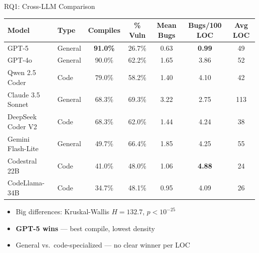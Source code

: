 \documentclass[aspectratio=169]{beamer}
\begin{document}
\begin{frame}{RQ1: Cross-LLM Comparison}
\begin{center}
\scriptsize
\begin{tabular}{@{}llccccc@{}}
\toprule
\textbf{Model} & \textbf{Type} & \textbf{Compiles} & \textbf{\% Vuln} & \textbf{Mean Bugs} & \textbf{Bugs/100 LOC} & \textbf{Avg LOC} \\
\midrule
GPT-5               & General & \textbf{91.0\%} & 26.7\% & 0.63 & \textbf{0.99} & 49 \\
GPT-4o              & General & 90.0\% & 62.2\% & 1.65 & 3.86 & 52 \\
Qwen 2.5 Coder      & Code    & 79.0\% & 58.2\% & 1.40 & 4.10 & 42 \\
Claude 3.5 Sonnet   & General & 68.3\% & 69.3\% & 3.22 & 2.75 & 113 \\
DeepSeek Coder V2   & Code    & 68.3\% & 62.0\% & 1.44 & 4.24 & 38 \\
Gemini Flash-Lite   & General & 49.7\% & 66.4\% & 1.85 & 4.25 & 55 \\
Codestral 22B       & Code    & 41.0\% & 48.0\% & 1.06 & \textbf{4.88} & 24 \\
CodeLlama-34B       & Code    & 34.7\% & 48.1\% & 0.95 & 4.09 & 26 \\
\bottomrule
\end{tabular}
\end{center}

\vspace{0.3cm}
\begin{itemize}
    \item Big differences: Kruskal-Wallis $H = 132.7$, $p < 10^{-25}$
    \item \textbf{GPT-5 wins} --- best compile, lowest density
    \item General vs.\ code-specialized --- no clear winner per LOC
\end{itemize}
\end{frame}
\end{document}
